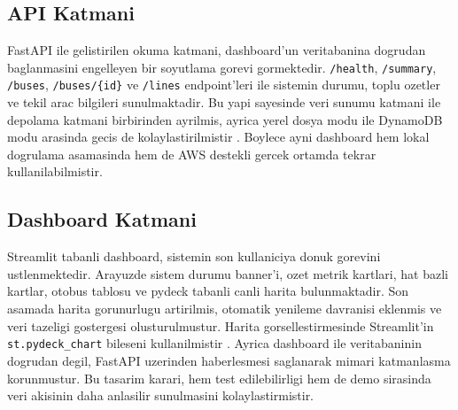 \subsection{API Katmani}

FastAPI ile gelistirilen okuma katmani, dashboard'un veritabanina dogrudan baglanmasini engelleyen bir soyutlama gorevi gormektedir. \texttt{/health}, \texttt{/summary}, \texttt{/buses}, \texttt{/buses/\{id\}} ve \texttt{/lines} endpoint'leri ile sistemin durumu, toplu ozetler ve tekil arac bilgileri sunulmaktadir. Bu yapi sayesinde veri sunumu katmani ile depolama katmani birbirinden ayrilmis, ayrica yerel dosya modu ile DynamoDB modu arasinda gecis de kolaylastirilmistir \cite{fastapi_first_steps}. Boylece ayni dashboard hem lokal dogrulama asamasinda hem de AWS destekli gercek ortamda tekrar kullanilabilmistir.

\subsection{Dashboard Katmani}

Streamlit tabanli dashboard, sistemin son kullaniciya donuk gorevini ustlenmektedir. Arayuzde sistem durumu banner'i, ozet metrik kartlari, hat bazli kartlar, otobus tablosu ve pydeck tabanli canli harita bulunmaktadir. Son asamada harita gorunurlugu artirilmis, otomatik yenileme davranisi eklenmis ve veri tazeligi gostergesi olusturulmustur. Harita gorsellestirmesinde Streamlit'in \texttt{st.pydeck\_chart} bileseni kullanilmistir \cite{streamlit_pydeck}. Ayrica dashboard ile veritabaninin dogrudan degil, FastAPI uzerinden haberlesmesi saglanarak mimari katmanlasma korunmustur. Bu tasarim karari, hem test edilebilirligi hem de demo sirasinda veri akisinin daha anlasilir sunulmasini kolaylastirmistir.
